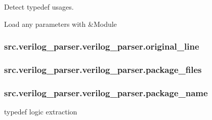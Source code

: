 Detect typedef usages. 

Load any parameters with \&Module \hypertarget{classsrc_1_1verilog__parser_1_1verilog__parser_a5233a3fc04bd927335ca10b2ff05e5f2}{
\subsubsection[{original\-\_\-line}]{\setlength{\rightskip}{0pt plus 5cm}src.\-verilog\-\_\-parser.\-verilog\-\_\-parser.\-original\-\_\-line}}\label{classsrc_1_1verilog__parser_1_1verilog__parser_a5233a3fc04bd927335ca10b2ff05e5f2}
\hypertarget{classsrc_1_1verilog__parser_1_1verilog__parser_a32cec6a447990615389a8cf249caa57c}{
\subsubsection[{package\-\_\-files}]{\setlength{\rightskip}{0pt plus 5cm}src.\-verilog\-\_\-parser.\-verilog\-\_\-parser.\-package\-\_\-files}}\label{classsrc_1_1verilog__parser_1_1verilog__parser_a32cec6a447990615389a8cf249caa57c}
\hypertarget{classsrc_1_1verilog__parser_1_1verilog__parser_ab2bdbf68ed106816c50e5845c26bbe67}{
\subsubsection[{package\-\_\-name}]{\setlength{\rightskip}{0pt plus 5cm}src.\-verilog\-\_\-parser.\-verilog\-\_\-parser.\-package\-\_\-name}}\label{classsrc_1_1verilog__parser_1_1verilog__parser_ab2bdbf68ed106816c50e5845c26bbe67}


typedef logic extraction 

